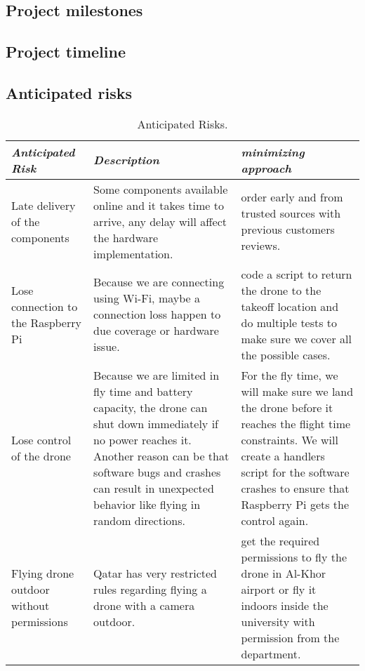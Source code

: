 \documentclass[../main.tex]{subfiles}
\begin{document}
\subsection{Project milestones}

\lipsum[1]

\subsection{Project timeline}

\lipsum[1]

\subsection{Anticipated risks}

\begin{table}[H]
	\centering
	\caption{Anticipated Risks.}
	\label{tab:Anticipated Risks}
	\begin{tabular}{ p{4.5cm} p{5.5cm} p{6cm} }
		\toprule
		\textit{Anticipated Risk} 
		& \textit{Description} 
		& \textit{minimizing approach} \\
		
		\midrule
		
		Late delivery of the components 
		& Some components available online 
		and it takes time to arrive, 
		any delay will affect the hardware implementation.
		& order early and from trusted sources with previous 
		customers reviews. \\
		
		Lose connection to the Raspberry Pi
		& Because we are connecting using Wi-Fi, maybe a connection loss 
		happen to due coverage or hardware issue.
		& code a script to return the drone to the takeoff location 
		and do multiple tests to make sure we cover all the possible cases. \\
		
		Lose control of the drone
		& Because we are limited in fly time and battery capacity, 
		the drone can shut down immediately if no power reaches it.
		Another reason can be that software bugs and crashes can 
		result in unexpected behavior like flying in random directions.
		& For the fly time, we will make sure we land the drone before it reaches the flight time constraints.
		We will create a handlers script for the software crashes 
		to ensure that Raspberry Pi gets the control again.  \\
		
		Flying drone outdoor without permissions 
		& Qatar has very restricted rules regarding flying a drone 
		with a camera outdoor.
		& get the required permissions to fly the drone in 
		Al-Khor airport or fly it indoors inside the university with permission from the department. \\
		
		\bottomrule		
	\end{tabular}
\end{table}
\end{document}
